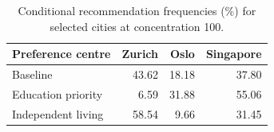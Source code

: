 \begin{table}[!ht]\centering
\caption{Conditional recommendation frequencies (\%) for selected cities at concentration 100.}
\begin{tabular}{lrrr}\toprule
Preference centre & Zurich & Oslo & Singapore\\\midrule
Baseline & 43.62 & 18.18 & 37.80 \\
Education priority & 6.59 & 31.88 & 55.06 \\
Independent living & 58.54 & 9.66 & 31.45 \\
\bottomrule\end{tabular}\end{table}
